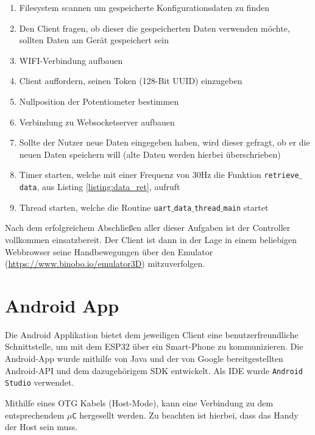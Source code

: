 \documentclass[paper=a4,12pt]{scrreprt}
\begin{document}
\begin{enumerate}
  \item Filesystem scannen um gespeicherte Konfigurationsdaten zu finden
  \item Den Client fragen, ob dieser die gespeicherten Daten verwenden möchte, sollten Daten am Gerät gespeichert sein
  \item WIFI-Verbindung aufbauen
  \item Client auffordern, seinen Token (128-Bit UUID) einzugeben
  \item Nullposition der Potentiometer bestimmen
  \item Verbindung zu Websocketserver aufbauen
  \item Sollte der Nutzer neue Daten eingegeben haben, wird dieser gefragt, ob er die neuen Daten speichern will (alte Daten werden hierbei überschrieben)
  \item Timer starten, welche mit einer Frequenz von 30Hz die Funktion \texttt{retrieve$\_$data}, aus Listing \ref{listing:data_ret}, aufruft
  \item Thread starten, welche die Routine \texttt{uart$\_$data$\_$thread$\_$main} startet
\end{enumerate}

Nach dem erfolgreichem Abschließen aller dieser Aufgaben ist der Controller vollkommen einsatzbereit. Der Client ist dann in der Lage in einem beliebigen Webbrowser
seine Handbewegungen über den Emulator (\url{https://www.binobo.io/emulator3D}) mitzuverfolgen.\newline


\chapter{Android App}

Die Android Applikation bietet dem jeweiligen Client eine benutzerfreundliche Schnittstelle, um mit dem ESP32 über ein Smart-Phone zu kommunizieren.\newline
Die Android-App wurde mithilfe von Java und der von Google bereitgestellten Android-API und dem dazugehörigem SDK entwickelt. Als IDE wurde \texttt{Android Studio}\cite{android_studio} verwendet.\newline

Mithilfe eines OTG Kabels (Host-Mode), kann eine Verbindung zu dem entsprechendem \texttt{$\mu$C} hergesellt werden. Zu beachten ist hierbei, dass das Handy der Host sein muss.\newline
\end{document}

